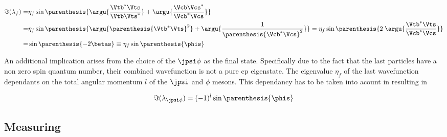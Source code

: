 \begin{align}
  \centering
 \Im(\lambda_f) =& \eta_f\sin\parenthesis{ \argu{\frac{\Vtb^*\Vts}{\Vtb\Vts^*}} + \argu{\frac{\Vcb\Vcs^*}{\Vcb^*\Vcs}} } \nonumber \\
                =& \eta_f\sin\parenthesis{ \argu{\parenthesis{\Vtb^*\Vts}^2}    + \argu{\frac{1}{\parenthesis{\Vcb^*\Vcs}^2}} }
                = \eta_f\sin\parenthesis{  2 \; \argu{\frac{\Vtb^*\Vts}{\Vcb^*\Vcs}} } \nonumber \\
                =& \sin\parenthesis{-2\betas}
                \equiv \eta_f\sin\parenthesis{\phis}
 \label{phis_def}
\end{align}

\noindent An additional implication arises from the choice of the $\jpsi\phi$ as the final state.
Specifically due to the fact that the last particles have a non zero spin quantum number, their combined wavefunction
is not a pure cp eigenstate. The eigenvalue $\eta_f$ of the last wavefunction dependants on the total angular momentum
$l$ of the $\jpsi$ and $\phi$ mesons. This dependancy has to be taken into acount in  resulting in 

\begin{equation}
 \Im(\lambda_{\jpsi\phi}) = (-1)^l\sin\parenthesis{\phis}
 \label{phis_jpsiphi_def}
\end{equation}

\subsection{Measuring \phis}
\label{measuring_phis}

